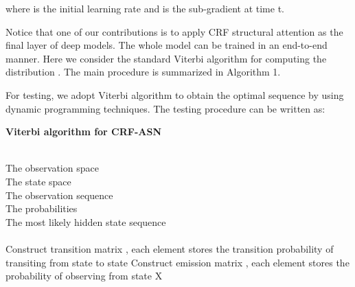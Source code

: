 \documentclass[sigconf]{acmart}
\begin{document}
where  is the initial learning rate and  is the sub-gradient at time t.

Notice that one of our contributions is to apply CRF structural attention as the final layer of deep models. The whole model can be trained in an end-to-end manner. Here we consider the standard Viterbi algorithm for computing the distribution . The main procedure is summarized in Algorithm 1.

For testing, we adopt Viterbi algorithm to obtain the optimal sequence by using dynamic programming techniques. The testing procedure can be written as:
 

\begin{algorithm}[t]
	\caption{\textbf{Viterbi algorithm for CRF-ASN}}
	\begin{algorithmic}[1]
		\REQUIRE ~~\\ The observation space  \\
	    The state space  \\
		The observation sequence  \\
	    The probabilities 
	    \ENSURE ~~\\
	    The most likely hidden state sequence  \\
	    ~~\\
	    \STATE Construct transition matrix , each element stores the transition probability of transiting from state  to state 
	    \STATE Construct emission matrix , each element stores the probability of observing  from state 
 		       \STATE 
               \STATE  		
		\ENDFOR
	                   \STATE     
                       \STATE                                                        	           
	           \ENDFOR
		\ENDFOR
		\STATE 
		\STATE 
		\FOR{}
		      \STATE  
		      \STATE 
		\ENDFOR
		\RETURN X
	\end{algorithmic}
\end{algorithm}
\end{document}
